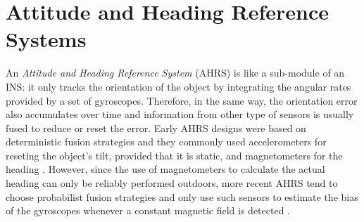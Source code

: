 \section{Attitude and Heading Reference Systems}
\label{sec:2_5_AHRS}
An \emph{Attitude and Heading Reference System} (AHRS) is like a sub-module of an INS: it only tracks the orientation of the object by integrating the angular rates provided by a set of gyroscopes.
Therefore, in the same way, the orientation error also accumulates over time and information from other type of sensors is usually fused to reduce or reset the error.
Early AHRS designs were based on deterministic fusion strategies and they commonly used accelerometers for reseting the object's tilt, provided that it is static, and magnetometers for the heading \cite{mahony_nonlinear_2008, madgwick_efficient_2010}.
However, since the use of magnetometers to calculate the actual heading can only be reliably performed outdoors, more recent AHRS tend to choose probabilist fusion strategies and only use such sensors to estimate the bias of the gyroscopes whenever a constant magnetic field is detected \cite{munoz_diaz_use_2017}.

